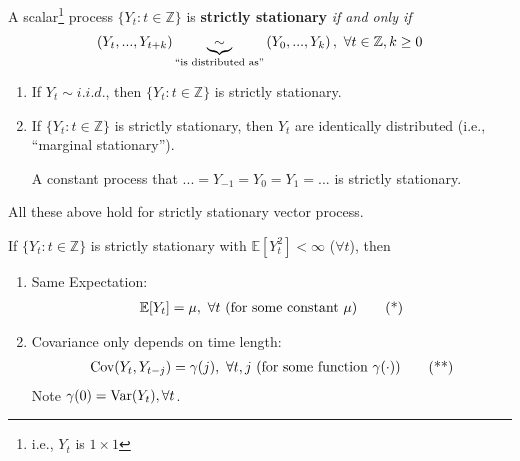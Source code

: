 \documentclass[11pt]{elegantbook}
\begin{document}
\begin{definition}
    A scalar\footnote{i.e., $Y_t$ is $1\times 1$} process $\{Y_t:t\in \mathbb{Z}\}$ is \textbf{strictly stationary} \textit{if and only if}
    \begin{equation}
        \begin{aligned}
            \left(Y_t,...,Y_{t+k}\right)\underbrace{\sim}_\textnormal{``is distributed as''} \left(Y_0,...,Y_{k}\right),\ \forall t\in \mathbb{Z},k\geq 0
        \end{aligned}
        \nonumber
    \end{equation}
\end{definition}
\begin{note}
    \begin{enumerate}
        \item If $Y_t\sim i.i.d.$, then $\{Y_t:t\in \mathbb{Z}\}$ is strictly stationary.
        \item If $\{Y_t:t\in \mathbb{Z}\}$ is strictly stationary, then $Y_t$ are identically distributed (i.e., ``marginal stationary'').
        \begin{example}
            A constant process that $...=Y_{-1}=Y_0=Y_1=...$ is strictly stationary.
        \end{example}
    \end{enumerate}
    All these above hold for strictly stationary vector process.
\end{note}

\begin{lemma}
    If $\{Y_t:t\in \mathbb{Z}\}$ is strictly stationary with $\mathbb{E}[Y_t^2]<\infty$ ($\forall t$), then
    \begin{enumerate}
        \item Same Expectation:
        \begin{equation}
            \begin{aligned}
                \mathbb{E}[Y_t]=\mu,\ \forall t \textnormal{ (for some constant $\mu$)}
            \end{aligned}
            \label{s}
            \tag{*}
        \end{equation}
        \item Covariance only depends on time length:
        \begin{equation}
            \begin{aligned}
                \textnormal{Cov}(Y_t,Y_{t-j})=\gamma(j),\ \forall t,j \textnormal{ (for some function $\gamma(\cdot)$)}
            \end{aligned}
            \label{ss}
            \tag{**}
        \end{equation}
        Note $\gamma(0)= \textnormal{Var}(Y_t),\forall t$.
    \end{enumerate}
\end{lemma}
\end{document}
